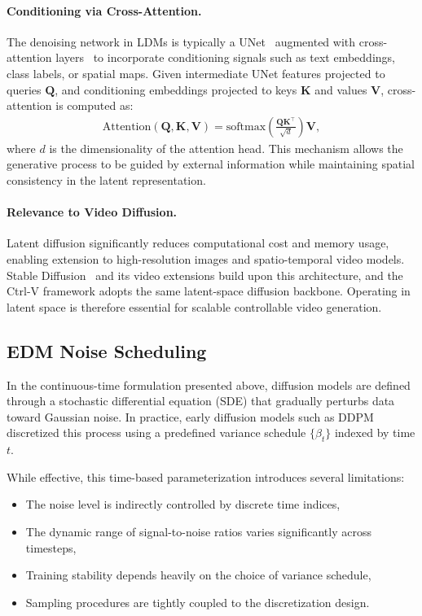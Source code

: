 \paragraph{Conditioning via Cross-Attention.}
The denoising network in LDMs is typically a UNet~\cite{ronneberger2015unet} augmented with cross-attention layers~\cite{vaswani2017attention} to incorporate conditioning signals such as text embeddings, class labels, or spatial maps. Given intermediate UNet features projected to queries $\mathbf{Q}$, and conditioning embeddings projected to keys $\mathbf{K}$ and values $\mathbf{V}$, cross-attention is computed as:
\begin{align}
    \text{Attention}(\mathbf{Q}, \mathbf{K}, \mathbf{V}) = \text{softmax}\!\left(\frac{\mathbf{Q}\mathbf{K}^\top}{\sqrt{d}}\right)\mathbf{V},
    \label{eq:cross_attention}
\end{align}
where $d$ is the dimensionality of the attention head. This mechanism allows the generative process to be guided by external information while maintaining spatial consistency in the latent representation.

\paragraph{Relevance to Video Diffusion.}
Latent diffusion significantly reduces computational cost and memory usage, enabling extension to high-resolution images and spatio-temporal video models. Stable Diffusion~\cite{rombach2022highresolution} and its video extensions build upon this architecture, and the Ctrl-V framework adopts the same latent-space diffusion backbone. Operating in latent space is therefore essential for scalable controllable video generation.

\subsection{EDM Noise Scheduling}
\label{subsec:edm}

In the continuous-time formulation presented above, diffusion models are defined through a stochastic differential equation (SDE) that gradually perturbs data toward Gaussian noise. In practice, early diffusion models such as DDPM discretized this process using a predefined variance schedule $\{\beta_t\}$ indexed by time $t$.

While effective, this time-based parameterization introduces several limitations:
\begin{itemize}
    \item The noise level is indirectly controlled by discrete time indices,
    \item The dynamic range of signal-to-noise ratios varies significantly across timesteps,
    \item Training stability depends heavily on the choice of variance schedule,
    \item Sampling procedures are tightly coupled to the discretization design.
\end{itemize}

